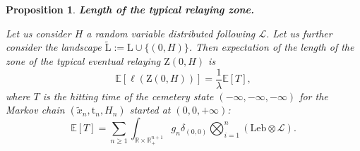 \documentclass[10pt,english,a4paper]{smfart}
\newtheorem{proposition}{Proposition}[section]
\theoremstyle{definition}
\theoremstyle{remark}
\newcommand{\R}{\mathbb{R}}
\newcommand{\Leb}{\mathrm{Leb}}
\newcommand{\landsc}{\mathrm{L}}
\newcommand{\Half}{\R \times \R_+}
\newcommand{\zone}{\mathrm{Z}}
\newcommand{\e}{\mathbb{E}}
\begin{document}
\begin{proposition}\label{mass_transport_save}\textbf{Length of the typical relaying zone.}

Let us consider $H$ a random variable distributed following $\mathcal{L}$. Let us further consider the landscape $\tilde{\landsc} := \landsc\cup \{(0, H)\}$. Then expectation of the length of the zone of the typical eventual relaying $\zone (0, H)$ is 
\[\e[\ell(\zone(0, H))] = \frac{1}{\lambda}\e[T],\]
where $T$ is the hitting time of the cemetery state $(-\infty, -\infty, -\infty)$ for the Markov chain $(\tilde{x}_n, \mathrm{t}_n, H_n)$ started at 
$(0, 0, +\infty)$:
\[\e[T] = \sum_{n\geq 1} \displaystyle\int_{\Half^{n+1}} g_n \delta_{(0, 0)}\displaystyle\bigotimes_{i=1}^{n} (\Leb \otimes \mathcal{L}).\]
\end{proposition}
\end{document}
